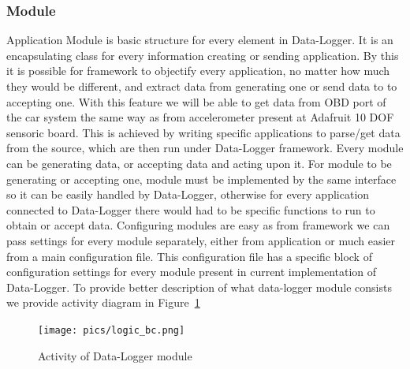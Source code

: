 \subsubsection{Module}
\label{ssub:module}
Application Module is basic structure for every element in Data-Logger. It is an encapsulating class for every information creating or sending application. By this it is possible for framework to objectify every application, no matter how much they would be different, and extract data from generating one or send data to to accepting one. With this feature we will be able to get data from OBD port of the car system the same way as from accelerometer present at Adafruit 10 DOF sensoric board. This is achieved by writing specific applications to parse/get data from the source, which are then run under Data-Logger framework. Every module can be generating data, or accepting data and acting upon it. For module to be generating or accepting one, module must be implemented by the same interface so it can be easily handled by Data-Logger, otherwise for every application connected to Data-Logger there would had to be specific functions to run to obtain or accept data. Configuring modules are easy as from framework we can pass settings for every module separately, either from application or much easier from a main configuration file. This configuration file has a specific block of configuration settings for every module present in current implementation of Data-Logger. To provide better description of what data-logger module consists we provide activity diagram in Figure~\ref{fig:activity}
\begin{figure}[H]
\begin{center}
\captionsetup{font=small}
\texttt{[image: pics/logic\_bc.png]}
\caption{Activity of Data-Logger module}
\label{fig:activity}
\end{center}
\end{figure}
